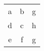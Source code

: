 \begin{table} 
    \begin{tabular}{ c c c }
        a & b & g \\ 
        d & c & h \\ 
        e & f & g \\ 
    \end{tabular} 
\end{table}
